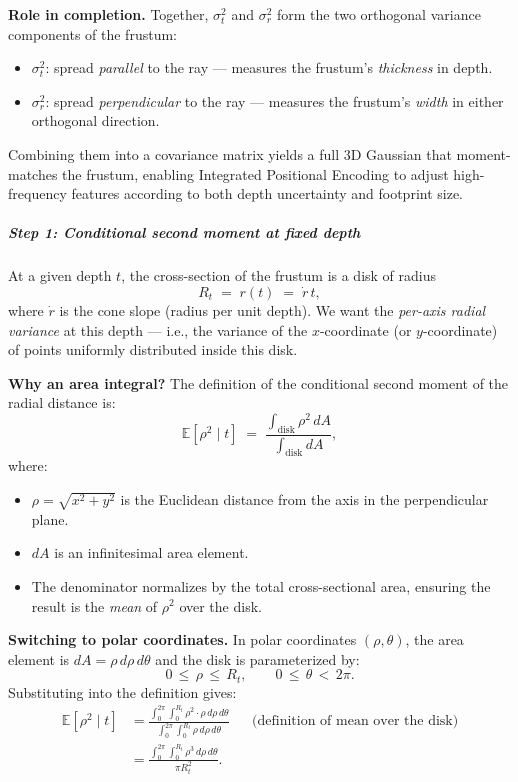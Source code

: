 \begin{enrichment}
\begin{enrichment}
    \noindent
    \textbf{Role in completion.}  
    Together, $\sigma_t^2$ and $\sigma_r^2$ form the two orthogonal variance components of the frustum:
    \begin{itemize}
        \item $\sigma_t^2$: spread \emph{parallel} to the ray — measures the frustum's \emph{thickness} in depth.
        \item $\sigma_r^2$: spread \emph{perpendicular} to the ray — measures the frustum's \emph{width} in either orthogonal direction.
    \end{itemize}
    Combining them into a covariance matrix yields a full 3D Gaussian that moment-matches the frustum, enabling Integrated Positional Encoding to adjust high-frequency features according to both depth uncertainty and footprint size.
    
    \subparagraph{Step 1: Conditional second moment at fixed depth}  
    At a given depth $t$, the cross-section of the frustum is a disk of radius
    \[
    R_t \;=\; r(t) \;=\; \dot{r} \, t,
    \]
    where $\dot{r}$ is the cone slope (radius per unit depth).  
    We want the \emph{per-axis radial variance} at this depth — i.e., the variance of the $x$-coordinate (or $y$-coordinate) of points uniformly distributed inside this disk.
    
    \noindent
    \textbf{Why an area integral?}  
    The definition of the conditional second moment of the radial distance is:
    \[
    \mathbb{E}[\rho^2 \mid t] \;=\; \frac{\displaystyle \int_{\text{disk}} \rho^2 \, dA}{\displaystyle \int_{\text{disk}} dA},
    \]
    where:
    \begin{itemize}
        \item $\rho = \sqrt{x^2 + y^2}$ is the Euclidean distance from the axis in the perpendicular plane.
        \item $dA$ is an infinitesimal area element.
        \item The denominator normalizes by the total cross-sectional area, ensuring the result is the \emph{mean} of $\rho^2$ over the disk.
    \end{itemize}
    
    \noindent
    \textbf{Switching to polar coordinates.}  
    In polar coordinates $(\rho, \theta)$, the area element is $dA = \rho \, d\rho \, d\theta$ and the disk is parameterized by:
    \[
    0 \,\leq\, \rho \,\leq\, R_t, 
    \qquad 0 \,\leq\, \theta \,<\, 2\pi.
    \]
    Substituting into the definition gives:
    \begin{align}
        \mathbb{E}[\rho^2 \mid t]
        &= \frac{\displaystyle \int_{0}^{2\pi} \!\! \int_{0}^{R_t} \rho^2 \cdot \rho \, d\rho \, d\theta}
        {\displaystyle \int_{0}^{2\pi} \!\! \int_{0}^{R_t} \rho \, d\rho \, d\theta}
        && \text{(definition of mean over the disk)} \\[0.4em]
        &= \frac{\displaystyle \int_{0}^{2\pi} \!\! \int_{0}^{R_t} \rho^3 \, d\rho \, d\theta}
        {\displaystyle \pi R_t^2}.
    \end{align}
    

\end{enrichment}
\end{enrichment}
